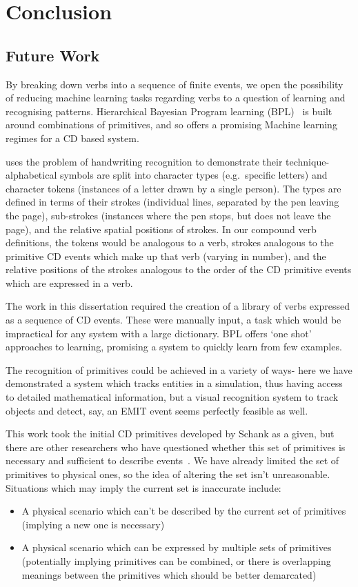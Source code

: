 \documentclass{article}
\begin{document}
    \section{Conclusion}
    \subsection{Future Work}
    By breaking down verbs into a sequence of finite events, we open the possibility of reducing machine learning tasks regarding verbs to a question of learning and recognising patterns. Hierarchical Bayesian Program learning (BPL)~\cite{one-shot-learning} is built around combinations of primitives, and so offers a promising Machine learning regimes for a CD based system.

    \citealt{one-shot-learning} uses the problem of handwriting recognition to demonstrate their technique- alphabetical symbols are split into character types (e.g.~specific letters) and character tokens (instances of a letter drawn by a single person). The types are defined in terms of their strokes (individual lines, separated by the pen leaving the page), sub-strokes (instances where the pen stops, but does not leave the page), and the relative spatial positions of strokes. In our compound verb definitions, the tokens would be analogous to a verb, strokes analogous to the primitive CD events which make up that verb (varying in number), and the relative positions of the strokes analogous to the order of the CD primitive events which are expressed in a verb.
    
    The work in this dissertation required the creation of a library of verbs expressed as a sequence of CD events. These were manually input, a task which would be impractical for any system with a large dictionary. BPL offers `one shot' approaches to learning, promising a system to quickly learn from few examples.
    
    The recognition of primitives could be achieved in a variety of ways- here we have demonstrated a system which tracks entities in a simulation, thus having access to detailed mathematical information, but a visual recognition system to track objects and detect, say, an EMIT event seems perfectly feasible as well.

    This work took the initial CD primitives developed by Schank as a given, but there are other researchers who have questioned whether this set of primitives is necessary and sufficient to describe events~\cite{macbethimage}. We have already limited the set of primitives to physical ones, so the idea of altering the set isn't unreasonable. Situations which may imply the current set is inaccurate include:
    \begin{itemize}
        \item A physical scenario which can't be described by the current set of primitives (implying a new one is necessary)
        \item A physical scenario which can be expressed by multiple sets of primitives (potentially implying primitives can be combined, or there is overlapping meanings between the primitives which should be better demarcated)
    \end{itemize}
\end{document}
